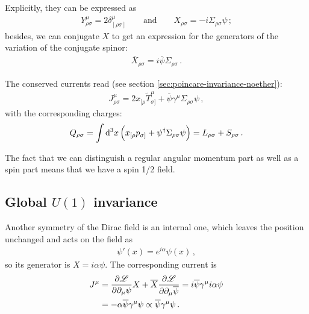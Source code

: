 \documentclass[main.tex]{subfiles}
\begin{document}
Explicitly, they can be expressed as 
%
\begin{align}
Y^{\mu }_{\rho \sigma } = 2 \delta^{\mu }_{[\rho \sigma ]}
\qquad \text{and} \qquad
X_{\rho \sigma } = -i \Sigma_{\rho \sigma } \psi 
\,;
\end{align}
%
besides, we can conjugate \(X\) to get an expression for the generators of the variation of the conjugate spinor: 
%
\begin{align}
\overline{X}_{\rho \sigma } = i \overline{\psi} \Sigma_{\rho \sigma }
\,.
\end{align}

The conserved currents read (see section \ref{sec:poincare-invariance-noether}): 
%
\begin{align}
J^{\mu }_{\rho \sigma } = 2 x_{[\rho }\widetilde{T}^{\mu }_{\sigma ]}
+ \overline{\psi} \gamma^{\mu } \Sigma_{\rho \sigma } \psi 
\,,
\end{align}
%
with the corresponding charges: 
%
\begin{align}
Q_{ \rho \sigma }
= \int \dd[3]{x} \qty(x_{[\rho } p_{\sigma ]}
+ \psi ^\dag \Sigma_{\rho \sigma } \psi )
= L_{ \rho \sigma } + S_{ \rho \sigma }
\,.
\end{align}

The fact that we can distinguish a regular angular momentum part as well as a spin part means that we have a spin 1/2 field. 

\subsection{Global \(U(1)\) invariance}

Another symmetry of the Dirac field is an internal one, which leaves the position unchanged and acts on the field as 
%
\begin{align}
\psi'(x) = e^{i \alpha } \psi (x)
\,,
\end{align}
%
so its generator is \(X = i \alpha \psi \). The corresponding current is 
%
\begin{subequations}
\begin{align}
J^{\mu } &= \pdv{\mathscr{L}}{\partial_{\mu }\psi } X + \overline{X} \pdv{\mathscr{L}}{\partial_{\mu } \overline{\psi}} = i \overline{\psi} \gamma^{\mu } i \alpha \psi   \\
&= - \alpha \overline{\psi} \gamma^{\mu } \psi \propto \overline{\psi} \gamma^{\mu } \psi 
\,. 
\end{align}
\end{subequations}
\end{document}
